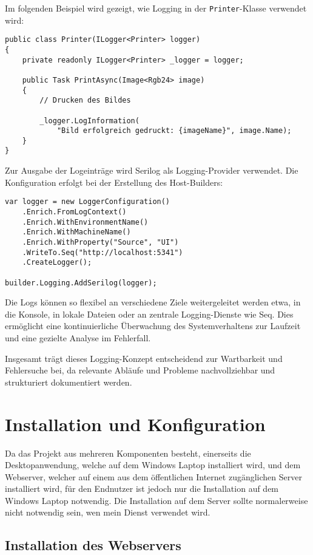 Im folgenden Beispiel wird gezeigt, wie Logging in der \texttt{Printer}-Klasse
verwendet wird:

\begin{lstlisting}
public class Printer(ILogger<Printer> logger)
{
    private readonly ILogger<Printer> _logger = logger;

    public Task PrintAsync(Image<Rgb24> image)
    {
        // Drucken des Bildes

        _logger.LogInformation(
            "Bild erfolgreich gedruckt: {imageName}", image.Name);
    }
}
\end{lstlisting}

Zur Ausgabe der Logeinträge wird Serilog als Logging-Provider verwendet.
Die Konfiguration erfolgt bei der Erstellung des Host-Builders:

\begin{lstlisting}
var logger = new LoggerConfiguration()
    .Enrich.FromLogContext()
    .Enrich.WithEnvironmentName()
    .Enrich.WithMachineName()
    .Enrich.WithProperty("Source", "UI")
    .WriteTo.Seq("http://localhost:5341")
    .CreateLogger();

builder.Logging.AddSerilog(logger);
\end{lstlisting}

Die Logs können so flexibel an verschiedene Ziele weitergeleitet werden etwa,
in die Konsole, in lokale Dateien oder an zentrale Logging-Dienste wie Seq.
Dies ermöglicht eine kontinuierliche Überwachung des Systemverhaltens zur
Laufzeit und eine gezielte Analyse im Fehlerfall.

Insgesamt trägt dieses Logging-Konzept entscheidend zur Wartbarkeit und Fehlersuche bei,
da relevante Abläufe und Probleme nachvollziehbar und strukturiert dokumentiert werden.

\section{Installation und Konfiguration}

Da das Projekt aus mehreren Komponenten besteht, einerseits die Desktopanwendung,
welche auf dem Windows Laptop installiert wird, und dem Webserver, welcher
auf einem aus dem öffentlichen Internet zugänglichen Server installiert wird,
für den Endnutzer ist jedoch nur die Installation auf dem Windows Laptop notwendig.
Die Installation auf dem Server sollte normalerweise nicht notwendig sein, wen
mein Dienst verwendet wird.

\subsection{Installation des Webservers}
